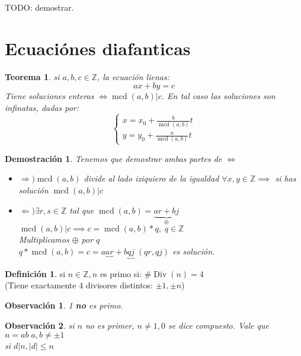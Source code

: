 \documentclass[9pt,a4paper,draft]{article}
\theoremstyle{definition}
\newtheorem{defi}{Definición}
\theoremstyle{plain}
\newtheorem{teo}{Teorema}
\newtheorem{demo}{Demostración}[teo]
\newtheorem{obs}{Observación}
\DeclareMathOperator{\Div}{Div}
\DeclareMathOperator{\mcd}{mcd}
\begin{document}
TODO: demostrar.

\section{Ecuaciónes diafanticas}

\begin{teo}\label{defdiafantica} si $a,b,c \in{\mathbb{Z}}$, la ecuación lienas:
$$ax+by=c$$
Tiene soluciones enteras $\iff \mcd(a,b)|c$. En tal caso las soluciones son infinatas, dadas por:
\[
\begin{cases}
x = x_0 + \frac{b}{\mcd(a,b)}t \\
y = y_0 + \frac{a}{\mcd(a,b)} t 
\end{cases}
\]
\end{teo}
\begin{demo} Tenemos que demostrar ambas partes de $\iff$\\
\begin{itemize}
\item $\Rightarrow) \mcd(a,b)$ divide al lado iziquiero de la igualdad $\forall{x,y}\in{\mathbb{Z}} \implies$ si has solución $\mcd(a,b)|c$ \\
\item $\Leftarrow) \exists{r,s}\in{\mathbb{Z}}$ tal que $\mcd(a,b) = \underbrace{ar+bj}_{\oplus}$ \\
$\mcd(a,b)|c \implies c = \mcd(a,b)*q,\; q\in{\mathbb{Z}}$\\
Multiplicamos $\oplus$ por $q$\\
$q*\mcd(a,b) = c = a\underbrace{ar}+b\underbrace{qj}\; (qr, qj)$ es solución.
\end{itemize}
\end{demo}

\begin{defi} si $n\in{\mathbb{Z}}, n$ es primo si: $\#\Div(n)=4$ \\
(Tiene exactamente 4 divisores distintos: $\pm1, \pm n$)\end{defi}

\begin{obs}
1 {\bfseries no} es primo. 
\end{obs}

\begin{obs}
si $n$ no es primer, $n\neq{1,0}$ se dice compuesto. Vale que $n=ab\; a,b\neq\pm1$\\
si $d|n, |d|\leq{n}$
\end{obs}
\end{document}
